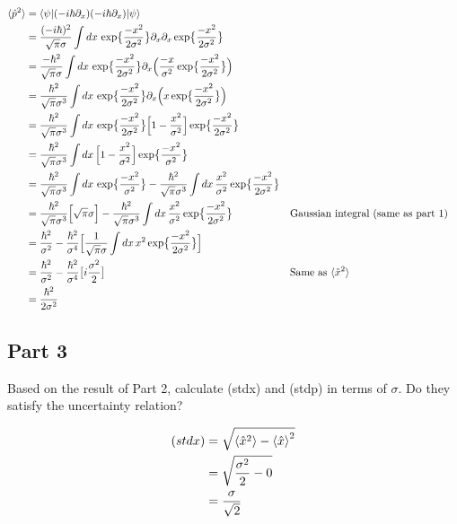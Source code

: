 \documentclass{article}
\newcommand{\D}[1]{{d#1 \,}}
\newcommand{\Poperator}[0]{-i \hbar \partial_x}
\renewcommand{\exp}[1]{\,\text{exp} \big\{ #1 \big\} }
\begin{document}
\begin{align*}
    \braket{\hat{p}^2}
    &= \braket{\psi|(\Poperator)(\Poperator)|\psi} \\
    &= \frac{(-i \hbar)^2}{\sqrt{\pi}\sigma} \int \D{x} \exp{\frac{-x^2}{2\sigma^2}} \partial_x \partial_x \exp{\frac{-x^2}{2\sigma^2}} \\
    &= \frac{-\hbar^2}{\sqrt{\pi}\sigma} \int \D{x} \exp{\frac{-x^2}{2\sigma^2}} \partial_x \Big( \frac{-x}{\sigma^2} \exp{\frac{-x^2}{2\sigma^2}} \Big) \\
    &= \frac{\hbar^2}{\sqrt{\pi}\sigma^3} \int \D{x} \exp{\frac{-x^2}{2\sigma^2}} \partial_x \Big( x \exp{\frac{-x^2}{2\sigma^2}} \Big) \\
    &= \frac{\hbar^2}{\sqrt{\pi}\sigma^3} \int \D{x} \exp{\frac{-x^2}{2\sigma^2}} \Big[ 1 - \frac{x^2}{\sigma^2} \Big] \exp{\frac{-x^2}{2\sigma^2}} \\
    &= \frac{\hbar^2}{\sqrt{\pi}\sigma^3} \int \D{x} \Big[ 1 - \frac{x^2}{\sigma^2} \Big] \exp{\frac{-x^2}{\sigma^2}} \\
    &= \frac{\hbar^2}{\sqrt{\pi}\sigma^3} \int \D{x} \exp{\frac{-x^2}{\sigma^2}} 
        - \frac{\hbar^2}{\sqrt{\pi}\sigma^3} \int \D{x} \frac{x^2}{\sigma^2} \exp{\frac{-x^2}{2\sigma^2}} \\
    &= \frac{\hbar^2}{\sqrt{\pi}\sigma^3} \Big[ \sqrt{\pi}\sigma \Big]
        - \frac{\hbar^2}{\sqrt{\pi}\sigma^3} \int \D{x} \frac{x^2}{\sigma^2} \exp{\frac{-x^2}{2\sigma^2}}
        && \text{Gaussian integral (same as part 1)} \\
    &= \frac{\hbar^2}{\sigma^2}
        - \frac{\hbar^2}{\sigma^4} \Big[ \frac{1}{\sqrt{\pi}\sigma} \int \D{x} x^2 \exp{\frac{-x^2}{2\sigma^2}} \Big] \\
    &= \frac{\hbar^2}{\sigma^2}
        - \frac{\hbar^2}{\sigma^4} \big[ i\frac{\sigma^2}{2} \big]
        && \text{Same as \(\braket{\hat{x}^2}\)}\\
    &= \frac{\hbar^2}{2\sigma^2}
\end{align*}


\subsection*{Part 3}
Based on the result of Part 2, calculate (stdx) and (stdp) in terms of $\sigma$.
Do they satisfy the uncertainty relation?

\begin{align*}
    (stdx) 
    &= \sqrt{\braket{\hat{x}^2} - \braket{\hat{x}}^2} \\
    &= \sqrt{\frac{\sigma^2}{2} - 0} \\
    &= \frac{\sigma}{\sqrt{2}}
\end{align*}
\end{document}
